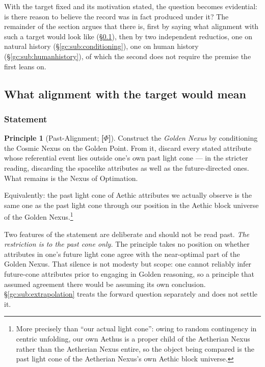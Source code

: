\documentclass[11pt]{article}
\numberwithin{equation}{section}
\theoremstyle{plain}
\theoremstyle{definition}
\newtheorem{principle}{Principle}
\theoremstyle{remark}
\begin{document}
With the target fixed and its motivation stated, the question becomes
evidential: is there reason to believe the record was in fact produced
under it? The remainder of the section argues that there is, first by
saying what alignment with such a target would look like
(\S\ref{gc:sub:pastalign}), then by two independent reductios, one on
natural history (\S\ref{gc:sub:conditioning}), one on human history
(\S\ref{gc:sub:humanhistory}), of which the second does not require
the premise the first leans on.

\subsection{What alignment with the target would mean}\label{gc:sub:pastalign}

\subsubsection{Statement}\label{gc:subsub:pastalign-statement}

\begin{principle}[Past-Alignment; \textbf{[$\Phi$]}]
\label{gc:prin:pastalign}
Construct the \emph{Golden Nexus} by conditioning the Cosmic Nexus on
the Golden Point. From it, discard every stated attribute whose
referential event lies outside one's own past light cone --- in the
stricter reading, discarding the spacelike attributes as well as the
future-directed ones. What remains is the Nexus of Optimation.

Equivalently: the past light cone of Aethic attributes we actually
observe is the same one as the past light cone through our position in
the Aethic block universe of the Golden Nexus.\footnote{More precisely
than ``our actual light cone'': owing to random contingency in centric
unfolding, our own Aethus is a proper child of the Aetherian Nexus
rather than the Aetherian Nexus entire, so the object being compared is
the past light cone of the Aetherian Nexus's own Aethic block universe.}
\end{principle}

Two features of the statement are deliberate and should not be read past. \emph{The restriction is to the past cone only.} The principle takes no
position on whether attributes in one's future light cone agree with the
near-optimal part of the Golden Nexus. That silence is not modesty but
scope: one cannot reliably infer future-cone attributes prior to
engaging in Golden reasoning, so a principle that assumed agreement
there would be assuming its own conclusion.
\S\ref{gc:sub:extrapolation} treats the forward question separately and
does not settle it.
\end{document}
